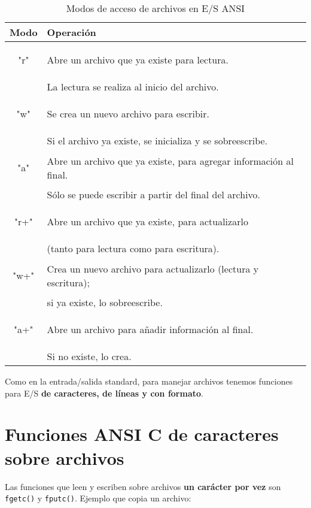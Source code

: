 \begin{table}[hbtp]
\centering
\begin{tabular}{c|l}
Modo & Operación \\
\hline
\begin{codecell}
"r"
\end{codecell} & Abre un archivo que ya existe para lectura. \\
				& La lectura se realiza al inicio del archivo.\\
\hline
\begin{codecell}
"w"
\end{codecell} & Se crea un nuevo archivo para escribir. \\
				& Si el archivo ya existe, se inicializa y se sobreescribe.\\
\hline
\begin{codecell}
"a" 
\end{codecell}& Abre un archivo que ya existe, para agregar información al final.\\ 
				& Sólo se puede escribir a partir del final del archivo.\\
\hline
\begin{codecell}
"r+"
\end{codecell}& Abre un archivo que ya existe, para actualizarlo \\
				& (tanto para lectura como para escritura).\\
\hline
\begin{codecell}
"w+"
\end{codecell}& Crea un nuevo archivo para actualizarlo (lectura y escritura); \\
				& si ya existe, lo sobreescribe.\\
\hline
\begin{codecell}
"a+"
\end{codecell}& Abre un archivo para añadir información al final. \\
				& Si no existe, lo crea.\\
\end{tabular}
\caption{Modos de acceso de archivos en E/S ANSI}
\label{tab:modos}
\end{table}

Como en la entrada/salida standard, para manejar archivos tenemos funciones
para E/S \textbf{de caracteres, de líneas y con formato}.

\section{Funciones ANSI C de caracteres sobre archivos}
\label{subsubsec:esarchivosansiccaract}
Las funciones que leen y escriben sobre archivos \textbf{un carácter por vez} son \lstinline{fgetc()} y \lstinline{fputc()}. Ejemplo que copia un archivo:

